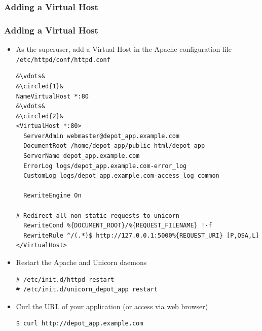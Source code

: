 \documentclass{beamer}
\newcommand*\circled[1]{\tikz[baseline=(char.base)]{
            \node[shape=circle,draw,inner sep=2pt] (char) {#1};}}
\newcommand{\comment}[2]{#2}
\begin{document}
\subsubsection{Adding a Virtual Host}
\begin{frame}
\frametitle{Adding a Virtual Host}
\begin{itemize}
 \item  As the superuser, add a Virtual Host in the Apache configuration file \texttt{/etc/httpd/conf/httpd.conf}

\lstset{language=shell, escapechar=&, numbers=left}
\begin{lstlisting}
&\vdots&
&\circled{1}&
NameVirtualHost *:80
&\vdots&
&\circled{2}&
<VirtualHost *:80>
  ServerAdmin webmaster@depot_app.example.com
  DocumentRoot /home/depot_app/public_html/depot_app
  ServerName depot_app.example.com
  ErrorLog logs/depot_app.example.com-error_log
  CustomLog logs/depot_app.example.com-access_log common

  RewriteEngine On

# Redirect all non-static requests to unicorn
  RewriteCond %{DOCUMENT_ROOT}/%{REQUEST_FILENAME} !-f 
  RewriteRule ^/(.*)$ http://127.0.0.1:5000%{REQUEST_URI} [P,QSA,L]
</VirtualHost>
\end{lstlisting}

\comment{
\item Add to the file \texttt{/etc/hosts}
\lstset{language=shell, escapechar=&}
\begin{lstlisting}
# echo "my.public.dns.amazonaws.com depot_app.com >> /etc/hosts" 
\end{lstlisting}
}


\item Restart the Apache and Unicorn daemons

\lstset{language=shell, escapechar=!}
\begin{lstlisting}[escapechar=!]
# /etc/init.d/httpd restart
# /etc/init.d/unicorn_depot_app restart
\end{lstlisting}

\item Curl the URL of your application (or access via web browser)

\begin{lstlisting}[escapechar=!]
$ curl http://depot_app.example.com
\end{lstlisting} 

\end{itemize}

\end{frame}
\end{document}
